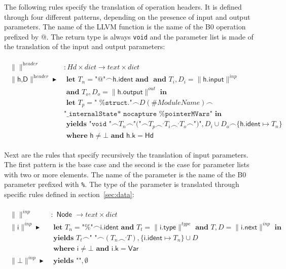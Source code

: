 \documentclass{article}
\newcommand{\trad}[2]{\ensuremath{\lVert \textsf{#1} \rVert^{\textit{#2}}}}
\newcommand{\mty}[0]{\texttt{""}}
\DeclareMathOperator{\conc}{\smallfrown}
\DeclareMathOperator{\isdef}{\blacktriangleright}
\begin{document}
The following rules specify the translation of operation headers. It
is defined through four different patterns, depending on the presence
of input and output parameters. The name of the LLVM function is the
name of the B0 operation prefixed by \mbox{@}. The return type is
always \texttt{void} and the parameter list is made of the translation
of the input and output parameters:

\begin{framed}
  \begin{align}
\begin{split}
    \trad{}{header} &: Hd \times dict \rightarrow text \times dict \\
    \trad{h,D}{header} \isdef& \textbf{ let } T_n = \textsf{"@"} \conc \textsf{h.ident}  \textbf{ and } 
    \textbf{ and } T_i, D_i = \trad{h.input}{inp} \\
    & \textbf{ and } T_o, D_o = \trad{h.output}{out} \textbf{ in}  \\
    & \textbf{ let } T_p = \texttt{" \%struct."} \conc D(\#ModuleName) \conc \\
    & \texttt{"\_internalState* nocapture \%pointerMVars"}  \textbf{ in}  \\
    & \textbf{ yields } \texttt{"void "} \conc T_n \conc \texttt{"("} \conc T_p \conc^, T_i \conc^, T_o \conc
    \texttt{")"}, D_i \cup D_o \conc \{ \textsf{h.ident} \mapsto T_n \}  \\
    & \textbf{ where } \textsf{h} \ne \bot \textbf{ and } \textsf{h.k} = \textsf{Hd} 
  \end{split}
\end{align}
\end{framed}

Next are the rules that specify recursively the translation of input
parameters. The first pattern is the base case and the second is the
case for parameter lists with two or more elements. The name of the
parameter is the name of the B0 parameter prefixed with \texttt{\%}.
The type of the parameter is translated through specific rules 
defined in section~\ref{sec:data}:

\begin{framed}
  \begin{align}
\begin{split}
    \trad{}{inp} &: \textsf{ Node } \rightarrow text \times dict \\
    \trad{i}{inp} \isdef& \textbf{ let } T_n = \textsf{"\%"} \conc \textsf{i.ident} 
    \textbf{ and } T_t = \trad{i.type}{type} 
    \textbf{ and } T, D = \trad{i.next}{inp} \textbf{ in}  \\
    & \textbf{ yields } T_t \conc \texttt{" "} \conc (T_n \conc^, T), \{ \textsf{i.ident} \mapsto T_n \} \cup D  \\
    & \textbf{ where } \textsf{i} \ne \bot \textbf{ and } \textsf{i.k} = \textsf{Var}  \\
    \trad{$\bot$}{inp} \isdef& \textbf{ yields } \mty, \emptyset 
  \end{split}
\end{align}
\end{framed}
\end{document}
